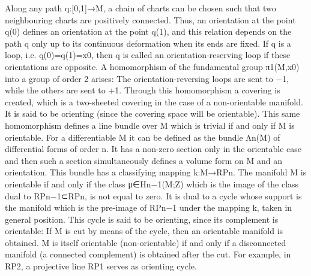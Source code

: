 Along any path q:[0,1]→M, a chain of charts can be chosen such that two neighbouring charts are positively connected. Thus, an orientation at the point q(0) defines an orientation at the point q(1), and this relation depends on the path q only up to its continuous deformation when its ends are fixed. If q is a loop, i.e. q(0)=q(1)=x0, then q is called an orientation-reserving loop if these orientations are opposite. A homomorphism of the fundamental group π1(M,x0) into a group of order 2 arises: The orientation-reversing loops are sent to −1, while the others are sent to +1. Through this homomorphism a covering is created, which is a two-sheeted covering in the case of a non-orientable manifold. It is said to be orienting (since the covering space will be orientable). This same homomorphism defines a line bundle over M which is trivial if and only if M is orientable. For a differentiable M it can be defined as the bundle Λn(M) of differential forms of order n. It has a non-zero section only in the orientable case and then such a section simultaneously defines a volume form on M and an orientation. This bundle has a classifying mapping k:M→RPn. The manifold M is orientable if and only if the class μ∈Hn−1(M;Z) which is the image of the class dual to RPn−1⊂RPn, is not equal to zero. It is dual to a cycle whose support is the manifold which is the pre-image of RPn−1 under the mapping k, taken in general position. This cycle is said to be orienting, since its complement is orientable: If M is cut by means of the cycle, then an orientable manifold is obtained. M is itself orientable (non-orientable) if and only if a disconnected manifold (a connected complement) is obtained after the cut. For example, in RP2, a projective line RP1 serves as orienting cycle.



















